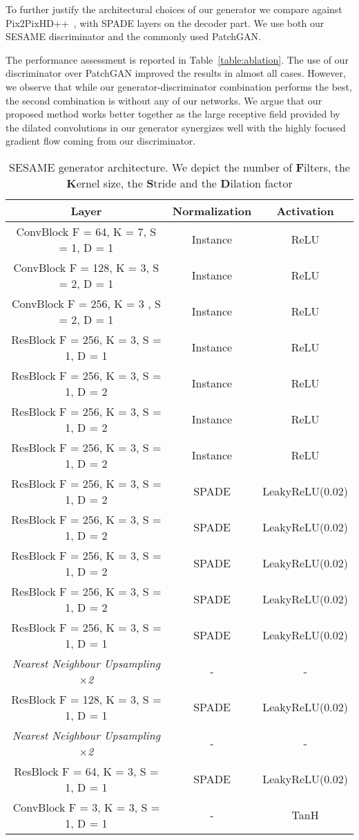 \documentclass[runningheads]{llncs}
\newcommand{\tref}[1]{Table~\ref{#1}}
\begin{document}
To further justify the architectural choices of our generator we compare against Pix2PixHD++~\cite{wang2018pix2pixHD},  with SPADE layers on the decoder part. 
We use both our SESAME discriminator and the commonly used PatchGAN.

The performance assessment is reported in \tref{table:ablation}. The use of our discriminator over PatchGAN improved the results in almost all cases.
However, we observe that while our generator-discriminator combination performs the best, the second combination is without any of our networks. We argue that our proposed method works better together as the large receptive field provided by the dilated convolutions in our generator synergizes well with the highly focused gradient flow coming from our discriminator. 

\begin{table}[]
    \centering
    \caption{SESAME generator architecture. We depict the number of \textbf{F}ilters, the \textbf{K}ernel size, the \textbf{S}tride and the \textbf{D}ilation factor}
    \begin{tabular}{c|c|c}
    Layer & Normalization & Activation \\
    \hline
ConvBlock F = 64, K = 7, S = 1, D = 1 & Instance & ReLU \\
ConvBlock F = 128, K = 3, S = 2, D = 1 & Instance & ReLU \\
ConvBlock F = 256, K = 3 , S = 2, D = 1 & Instance & ReLU \\
ResBlock F = 256, K = 3, S = 1, D = 1 & Instance & ReLU \\
ResBlock F = 256, K = 3, S = 1, D = 2 & Instance & ReLU \\
ResBlock F = 256, K = 3, S = 1, D = 2 & Instance & ReLU \\
ResBlock F = 256, K = 3, S = 1, D = 2 & Instance & ReLU \\
ResBlock F = 256, K = 3, S = 1, D = 2 & SPADE & LeakyReLU(0.02) \\
ResBlock F = 256, K = 3, S = 1, D = 2 & SPADE & LeakyReLU(0.02) \\
ResBlock F = 256, K = 3, S = 1, D = 2 & SPADE & LeakyReLU(0.02) \\
ResBlock F = 256, K = 3, S = 1, D = 2 & SPADE & LeakyReLU(0.02) \\
ResBlock F = 256, K = 3, S = 1, D = 1 & SPADE & LeakyReLU(0.02) \\
\textit{Nearest Neighbour Upsampling $\times$2} & - & - \\
ResBlock F = 128, K = 3, S = 1, D = 1 & SPADE & LeakyReLU(0.02) \\
\textit{Nearest Neighbour Upsampling $\times$2} & - & - \\
ResBlock F = 64, K = 3, S = 1, D = 1 & SPADE & LeakyReLU(0.02) \\
ConvBlock F = 3, K = 3, S = 1, D = 1 & - & TanH \\
    \end{tabular}
    \label{tab:gen_arch}
\end{table}
\end{document}
